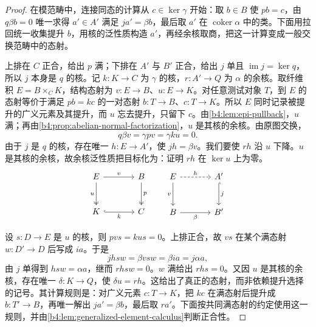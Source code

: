\begin{proof}
	在模范畴中，连接同态的计算从 \(c\in\ker\gamma\) 开始：取 \(b\in B\) 使 \(pb=c\)，由 \(q\beta b=0\) 唯一求得 \(a'\in A'\) 满足 \(ja'=\beta b\)，最后取 \(a'\) 在 \(\operatorname{coker}\alpha\) 中的类。下面用拉回统一收集提升 \(b\)，用核的泛性质构造 \(a'\)，再经余核取商，把这一计算变成一般交换范畴中的态射。

	上排在 \(C\) 正合，给出 \(p\) 满；下排在 \(A'\) 与 \(B'\) 正合，给出 \(j\) 单且 \(\operatorname{im}j=\ker q\)，所以 \(j\) 本身是 \(q\) 的核。记 \(k:K\to C\) 为 \(\gamma\) 的核，\(r:A'\to Q\) 为 \(\alpha\) 的余核。取纤维积 \(E=B\times_C K\)，结构态射为 \(v:E\to B\)、\(u:E\to K\)。对任意测试对象 \(T\)，到 \(E\) 的态射等价于满足 \(pb=kc\) 的一对态射 \(b:T\to B\)、\(c:T\to K\)。所以 \(E\) 同时记录被提升的广义元素及其提升，而 \(u\) 忘去提升，只留下 \(c\)。由\cref{b4:lem:epi-pullback}，\(u\) 满；再由\cref{b4:prop:abelian-normal-factorization}，\(u\) 是其核的余核。由原图交换，
	\[
		q\beta v=\gamma pv=\gamma ku=0.
	\]
	由于 \(j\) 是 \(q\) 的核，存在唯一 \(h:E\to A'\)，使 \(jh=\beta v\)。我们要使 \(rh\) 沿 \(u\) 下降。\(u\) 是其核的余核，故余核泛性质把目标化为：证明 \(rh\) 在 \(\ker u\) 上为零。
	\[
		\begin{tikzcd}[column sep=large,row sep=large]
			E\arrow[r,"v"]\arrow[d,two heads,"u"']&B\arrow[d,two heads,"p"]\\
			K\arrow[r,hook,"k"']&C
		\end{tikzcd}
		\qquad
		\begin{tikzcd}[column sep=large,row sep=large]
			E\arrow[r,dashed,"h"]\arrow[d,"v"']&A'\arrow[d,hook,"j"]\\
			B\arrow[r,"\beta"']&B'
		\end{tikzcd}
	\]

	设 \(s:D\to E\) 是 \(u\) 的核，则 \(pvs=kus=0\)。上排正合，故 \(vs\) 在某个满态射 \(w:D'\to D\) 后写成 \(i a\)。于是
	\[
		jhsw=\beta vsw=\beta i a=j\alpha a,
	\]
	由 \(j\) 单得到 \(hsw=\alpha a\)，继而 \(rhsw=0\)。\(w\) 满给出 \(rhs=0\)。又因 \(u\) 是其核的余核，存在唯一 \(\delta:K\to Q\)，使 \(\delta u=rh\)。这给出了真正的态射，而非依赖提升选择的记号。其计算规则是：对广义元素 \(c:T\to K\)，把 \(kc\) 在满态射后提升成 \(b:T'\to B\)，再唯一解出 \(j a'=\beta b\)，最后取 \(r a'\)。下面按共同满态射的约定使用这一规则，并由\cref{b4:lem:generalized-element-calculus}判断正合性。


\end{proof}

